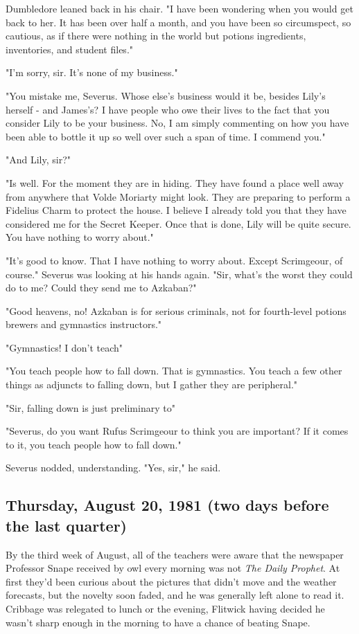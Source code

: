 Dumbledore leaned back in his chair. "I have been wondering when you would get back to her. It has been over half a month, and you have been so circumspect, so cautious, as if there were nothing in the world but potions ingredients, inventories, and student files."

"I'm sorry, sir. It's none of my business."

"You mistake me, Severus. Whose else's business would it be, besides Lily's herself - and James's? I have people who owe their lives to the fact that you consider Lily to be your business. No, I am simply commenting on how you have been able to bottle it up so well over such a span of time. I commend you."

"And Lily, sir?"

"Is well. For the moment they are in hiding. They have found a place well away from anywhere that Volde{\el} Moriarty might look. They are preparing to perform a Fidelius Charm to protect the house. I believe I already told you that they have considered me for the Secret Keeper. Once that is done, Lily will be quite secure. You have nothing to worry about."

"It's good to know. That I have nothing to worry about. Except Scrimgeour, of course." Severus was looking at his hands again. "Sir, what's the worst they could do to me? Could they send me to Azkaban?"

"Good heavens, no! Azkaban is for serious criminals, not for fourth-level potions brewers and gymnastics instructors."

"Gymnastics! I don't teach{\el}"

"You teach people how to fall down. That is gymnastics. You teach a few other things as adjuncts to falling down, but I gather they are peripheral."

"Sir, falling down is just preliminary to{\el}"

"Severus, do you want Rufus Scrimgeour to think you are important? If it comes to it, you teach people how to fall down."

Severus nodded, understanding. "Yes, sir," he said.

\subsection{Thursday, August 20, 1981 (two days before the last quarter)}

By the third week of August, all of the teachers were aware that the newspaper Professor Snape received by owl every morning was not \emph{The Daily Prophet}. At first they'd been curious about the pictures that didn't move and the weather forecasts, but the novelty soon faded, and he was generally left alone to read it. Cribbage was relegated to lunch or the evening, Flitwick having decided he wasn't sharp enough in the morning to have a chance of beating Snape.

